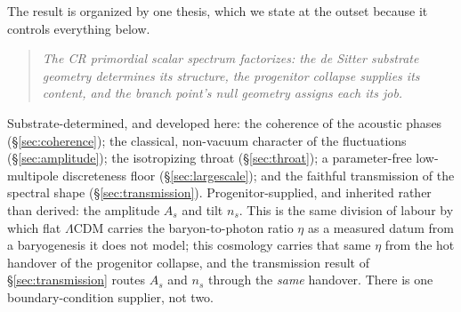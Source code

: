 \documentclass[11pt,a4paper]{article}
\theoremstyle{plain}
\theoremstyle{definition}
\theoremstyle{remark}
\begin{document}
The result is organized by one thesis, which we state at the outset because it controls everything below.

\begin{quote}
\emph{The CR primordial scalar spectrum factorizes: the de Sitter substrate geometry determines its structure, the progenitor collapse supplies its content, and the branch point's null geometry assigns each its job.}
\end{quote}

Substrate-determined, and developed here: the coherence of the acoustic phases (\S\ref{sec:coherence}); the classical, non-vacuum character of the fluctuations (\S\ref{sec:amplitude}); the isotropizing throat (\S\ref{sec:throat}); a parameter-free low-multipole discreteness floor (\S\ref{sec:largescale}); and the faithful transmission of the spectral shape (\S\ref{sec:transmission}). Progenitor-supplied, and inherited rather than derived: the amplitude $A_s$ and tilt $n_s$. This is the same division of labour by which flat $\Lambda$CDM carries the baryon-to-photon ratio $\eta$ as a measured datum from a baryogenesis it does not model; this cosmology carries that same $\eta$ from the hot handover of the progenitor collapse, and the transmission result of \S\ref{sec:transmission} routes $A_s$ and $n_s$ through the \emph{same} handover. There is one boundary-condition supplier, not two.
\end{document}
